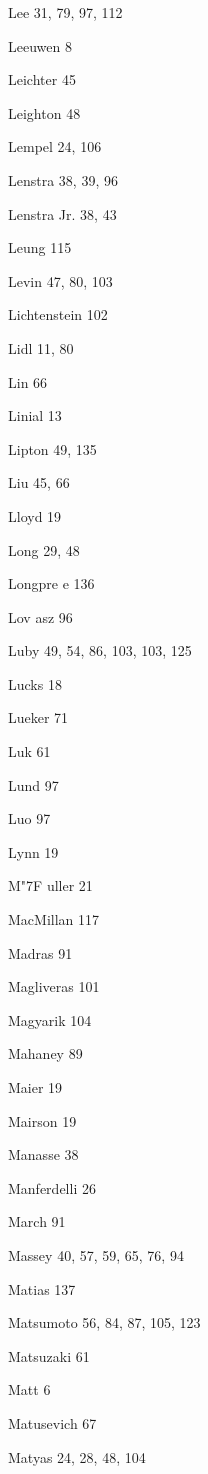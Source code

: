 \begin{theindex}
\item Lee 31, 79, 97, 112
\item Leeuwen 8
\item Leichter 45
\item Leighton 48
\item Lempel 24, 106
\item Lenstra 38, 39, 96
\item {Lenstra Jr.} 38, 43
\item Leung 115
\item Levin 47, 80, 103
\item Lichtenstein 102
\item Lidl 11, 80
\item Lin 66
\item Linial 13
\item Lipton 49, 135
\item Liu 45, 66
\item Lloyd 19
\item Long 29, 48
\item Longpre{ e} 136
\item Lov{ a}sz 96
\item Luby 49, 54, 86, 103, 103, 125
\item Lucks 18
\item Lueker 71
\item Luk 61
\item Lund 97
\item Luo 97
\item Lynn 19
\item M{\accent "7F u}ller 21
\item MacMillan 117
\item Madras 91
\item Magliveras 101
\item Magyarik 104
\item Mahaney 89
\item Maier 19
\item Mairson 19
\item Manasse 38
\item Manferdelli 26
\item March 91
\item Massey 40, 57, 59, 65, 76, 94
\item Matias 137
\item Matsumoto 56, 84, 87, 105, 123
\item Matsuzaki 61
\item Matt 6
\item Matusevich 67
\item Matyas 24, 28, 48, 104

\end{theindex}
